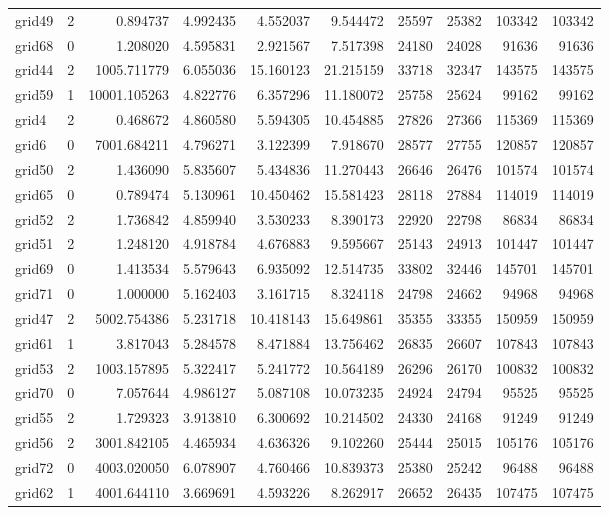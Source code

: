 \begin{longtable}{|l|r|r|r|r|r|r|r|r|r|}
grid49 & 2 & 0.894737 & 4.992435 & 4.552037 & 9.544472 & 25597 & 25382 & 103342 & 103342 \\
grid68 & 0 & 1.208020 & 4.595831 & 2.921567 & 7.517398 & 24180 & 24028 & 91636 & 91636 \\
grid44 & 2 & 1005.711779 & 6.055036 & 15.160123 & 21.215159 & 33718 & 32347 & 143575 & 143575 \\
grid59 & 1 & 10001.105263 & 4.822776 & 6.357296 & 11.180072 & 25758 & 25624 & 99162 & 99162 \\
grid4 & 2 & 0.468672 & 4.860580 & 5.594305 & 10.454885 & 27826 & 27366 & 115369 & 115369 \\
grid6 & 0 & 7001.684211 & 4.796271 & 3.122399 & 7.918670 & 28577 & 27755 & 120857 & 120857 \\
grid50 & 2 & 1.436090 & 5.835607 & 5.434836 & 11.270443 & 26646 & 26476 & 101574 & 101574 \\
grid65 & 0 & 0.789474 & 5.130961 & 10.450462 & 15.581423 & 28118 & 27884 & 114019 & 114019 \\
grid52 & 2 & 1.736842 & 4.859940 & 3.530233 & 8.390173 & 22920 & 22798 & 86834 & 86834 \\
grid51 & 2 & 1.248120 & 4.918784 & 4.676883 & 9.595667 & 25143 & 24913 & 101447 & 101447 \\
grid69 & 0 & 1.413534 & 5.579643 & 6.935092 & 12.514735 & 33802 & 32446 & 145701 & 145701 \\
grid71 & 0 & 1.000000 & 5.162403 & 3.161715 & 8.324118 & 24798 & 24662 & 94968 & 94968 \\
grid47 & 2 & 5002.754386 & 5.231718 & 10.418143 & 15.649861 & 35355 & 33355 & 150959 & 150959 \\
grid61 & 1 & 3.817043 & 5.284578 & 8.471884 & 13.756462 & 26835 & 26607 & 107843 & 107843 \\
grid53 & 2 & 1003.157895 & 5.322417 & 5.241772 & 10.564189 & 26296 & 26170 & 100832 & 100832 \\
grid70 & 0 & 7.057644 & 4.986127 & 5.087108 & 10.073235 & 24924 & 24794 & 95525 & 95525 \\
grid55 & 2 & 1.729323 & 3.913810 & 6.300692 & 10.214502 & 24330 & 24168 & 91249 & 91249 \\
grid56 & 2 & 3001.842105 & 4.465934 & 4.636326 & 9.102260 & 25444 & 25015 & 105176 & 105176 \\
grid72 & 0 & 4003.020050 & 6.078907 & 4.760466 & 10.839373 & 25380 & 25242 & 96488 & 96488 \\
grid62 & 1 & 4001.644110 & 3.669691 & 4.593226 & 8.262917 & 26652 & 26435 & 107475 & 107475 \\

\end{longtable}
